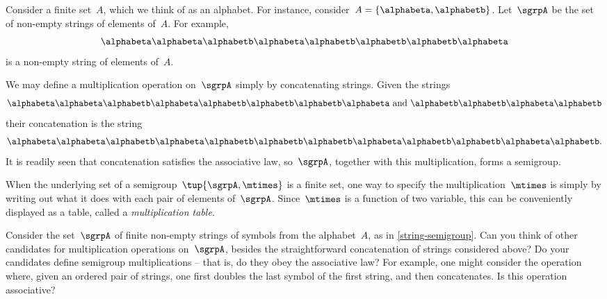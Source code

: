 \begin{example}
  \label{string-semigroup}
  Consider a finite set~$A$, which we think of as an alphabet. For instance, consider~$A = \{ \alphabeta, \alphabetb \}$.
  Let~$\sgrpA$ be the set of non-empty strings of elements of~$A$. For example,
  \begin{equation*}
    \alphabeta\alphabeta \alphabetb \alphabeta \alphabetb \alphabetb \alphabetb \alphabeta
  \end{equation*}
  is a non-empty string of elements of~$A$.

  We may define a multiplication operation on~$\sgrpA$ simply by concatenating strings. Given the strings
  \begin{equation*}
    \alphabeta \alphabeta \alphabetb \alphabeta \alphabetb \alphabetb \alphabetb \alphabeta \text{ and } \alphabetb \alphabetb \alphabeta \alphabetb
  \end{equation*}
  their concatenation is the string
  \begin{equation*}
    \alphabeta \alphabeta \alphabetb \alphabeta \alphabetb \alphabetb \alphabetb \alphabeta \alphabetb \alphabetb \alphabeta \alphabetb.
  \end{equation*}
  It is readily seen that concatenation satisfies the associative law, so~$\sgrpA$, together with this multiplication, forms a semigroup.
\end{example}


When the underlying set of a semigroup~$\tup{\sgrpA, \mtimes}$ is a finite set, one way to specify the multiplication~$\mtimes$ is simply by writing out what it does with each pair of elements of~$\sgrpA$.
Since~$\mtimes$ is a function of two variable, this can be conveniently displayed as a table, called a \emph{multiplication table}.


\begin{exercise}
  \label{ex:alphabet}
  Consider the set~$\sgrpA$ of finite non-empty strings of symbols from the alphabet~$A$, as in \cref{string-semigroup}. Can you think of other candidates for multiplication operations on~$\sgrpA$, besides the straightforward concatenation of strings considered above? Do your candidates define semigroup multiplications -- that is, do they obey the associative law?
  For example, one might consider the operation where, given an ordered pair of strings, one first doubles the last symbol of the first string, and then concatenates. Is this operation associative?
\end{exercise}
\begin{solution}
\end{solution}


